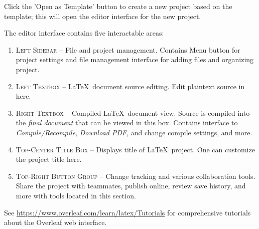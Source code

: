 Click the 'Open as Template' button to create a new project based on the template; this will open the editor interface for the new project.

\begin{minipage}{\linewidth}
\label{fig:EditorInterface}
\end{minipage}

The editor interface contains five interactable areas:
\begin{enumerate}
    \item \textsc{ Left Sidebar} --
        File and project management. Contains Menu button for project settings and file management interface for adding files and organizing project.
    \item \textsc{ Left Textbox} --
        \LaTeX\ document source editing. Edit plaintext source in here.
   \item \textsc{ Right Textbox} --
        Compiled \LaTeX\ document view. Source is compiled into the \textit{final document} that can be viewed in this box. Contains interface to \textit{Compile/Recompile}, \textit{Download PDF}, and change compile settings, and more.
    \item \textsc{ Top-Center Title Box} --
        Displays title of \LaTeX\ project. One can customize the project title here.
    \item \textsc{ Top-Right Button Group} --
        Change tracking and various collaboration tools. Share the project with teammates, publish online, review save history, and more with tools located in this section.
\end{enumerate}
See \url{https://www.overleaf.com/learn/latex/Tutorials} for comprehensive tutorials about the Overleaf web interface.


